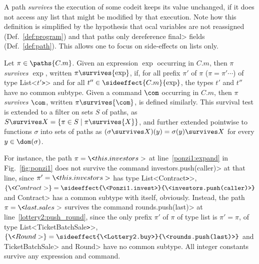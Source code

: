 A path \emph{survives} the execution of some code\ie it keeps its value unchanged,
if it does not access any list that might be modified by that execution. Note how this
definition is simplified by the hypothesis that ocal variables are not reassigned
(Def.~\ref{def:program}) and that paths only dereference
\<final> fields (Def.~\ref{def:path}). This allows one to focus on side-effects on lists only.
%
\begin{definition}\label{def:survival}
  Let $\pi\in\paths{C.m}$. Given an expression $\exp$ occurring in $C.m$, then
  \emph{$\pi$ survives $\exp$}, written $\pi\survives{\exp}$, if, for all prefix $\pi'$ of $\pi$
  (\ieinitial  $\pi=\pi'\cdots$) of type \<List<$t'$\texttt{>}>
  and for all $t''\in\sideeffect{C.m}{\exp}$, the types
  $t'$ and $t''$ have no common subtype.
  Given a command $\com$ occurring in $C.m$, then \emph{$\pi$ survives $\com$}, written $\pi\survives{\com}$, is defined similarly.
  This survival test is extended to a filter on sets $S$ of paths, as $S\survives X=\{\pi\in S\mid\pi\survives{X}\}$,
  and further extended pointwise to functions $\sigma$ into sets of paths as
  $(\sigma\survives X)(y)=\sigma(y)\survives X$ for every $y\in\dom(\sigma)$. 
\end{definition}
%
For instance, the path $\pi=\<this.investors>$ at
line~\ref{ponzi1:expand} in Fig.~\ref{fig:ponzi1} does not survive
the command \<investors.push(caller)> at that line, since $\pi'=\<this.investors>$
has type \<List<Contract\texttt{>}>,
$\{\<Contract>\}=\sideeffect{\<Ponzi1.invest>}{\<investors.push(caller)>}$
and \<Contract> has a common subtype with itself, obviously.
Instead, the path $\pi=\<last.sales>$
survives the command \<rounds.push(last)>
at line~\ref{lottery2:push_round}, since
the only prefix $\pi'$ of $\pi$ of type list is $\pi'=\pi$, of type
\<List<TicketBatchSale\texttt{>}>,
$\{\<Round>\}=\sideeffect{\<Lottery2.buy>}{\<rounds.push(last)>}$ and
\<TicketBatchSale> and \<Round> have no common subtype.
All integer constants survive any expression and command.


